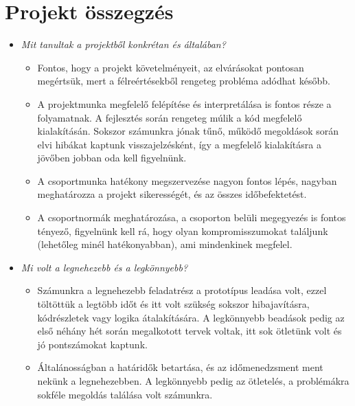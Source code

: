 \documentclass[../../projlab]{subfiles}
\begin{document}
\section{Projekt összegzés}
\begin{itemize}
\item \textit{Mit tanultak a projektből konkrétan és általában?} \newline
    
    \begin{itemize}
        \item Fontos, hogy a projekt követelményeit, az elvárásokat pontosan megértsük, mert a félreértésekből rengeteg probléma adódhat később. 
        \item A projektmunka megfelelő felépítése és interpretálása is fontos része a folyamatnak. A fejlesztés során rengeteg múlik a kód megfelelő kialakításán. Sokszor számunkra jónak tűnő, működő megoldások során elvi hibákat kaptunk visszajelzésként, így a megfelelő kialakításra a jövőben jobban oda kell figyelnünk. 
        \item A csoportmunka hatékony megszervezése nagyon fontos lépés, nagyban meghatározza a projekt sikerességét, és az összes időbefektetést. 
        \item A csoportnormák meghatározása, a csoporton belüli megegyezés is fontos tényező, figyelnünk kell rá, hogy olyan kompromisszumokat találjunk (lehetőleg minél hatékonyabban), ami mindenkinek megfelel.  
    \end{itemize}

\item \textit{Mi volt a legnehezebb és a legkönnyebb?} \newline

    \begin{itemize}
        \item Számunkra a legnehezebb feladatrész a prototípus leadása volt, ezzel töltöttük a legtöbb időt és itt volt szükség sokszor hibajavításra, kódrészletek vagy logika átalakítására. A legkönnyebb beadások pedig az első néhány hét során megalkotott tervek voltak, itt sok ötletünk volt és jó pontszámokat kaptunk. 
        \item Általánosságban a határidők betartása, és az időmenedzsment ment nekünk a legnehezebben. A legkönnyebb pedig az ötletelés, a problémákra sokféle megoldás találása volt számunkra.
    \end{itemize}
    

\end{itemize}
\end{document}
